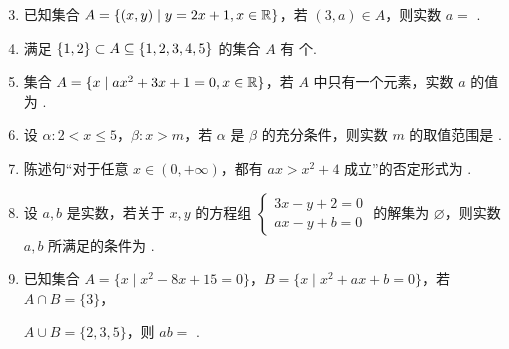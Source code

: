 \documentclass[a4paper,11pt]{article}
\begin{document}


\begin{enumerate}
\setcounter{enumi}{2}

\item 已知集合 $A=\{(x,y)\mid y=2x+1,x\in\mathbb{R}\}$，若 $(3,a)\in A$，则实数 $a=$ \blankline[4.4em].

\ifanswer
\solbegin
{}
\solend

\fi

\item 满足 $\{1,2\}\subset A\subseteq\{1,2,3,4,5\}$ 的集合 $A$ 有 \blankline[4.4em] 个.


\item 集合 $A=\{x\mid ax^2+3x+1=0,x\in\mathbb{R}\}$，若 $A$ 中只有一个元素，实数 $a$ 的值为 \blankline[4.4em].


\item 设 $\alpha:2<x\leqslant5$，$\beta:x>m$，若 $\alpha$ 是 $\beta$ 的充分条件，则实数 $m$ 的取值范围是 \blankline[4.4em].

\ifanswer
\solbegin
\step{由题意得 $m\leqslant2$. 故实数 $m$ 的取值范围是 $[2,+\infty)$.}
\solend

\fi

\item 陈述句“对于任意 $x\in(0,+\infty)$，都有 $ax>x^2+4$ 成立”的否定形式为 \blankline[4.4em].


\item 设 $a,b$ 是实数，若关于 $x,y$ 的方程组 $\begin{cases}3x-y+2=0\\ ax-y+b=0\end{cases}$ 的解集为 $\varnothing$，则实数 $a,b$ 所满足的条件为 \blankline[4.4em].


\item 已知集合 $A=\{x\mid x^2-8x+15=0\}$，$B=\{x\mid x^2+ax+b=0\}$，若 $A\cap B=\{3\}$，

$A\cup B=\{2,3,5\}$，则 $ab=$ \blankline[4.4em].


\end{enumerate}
\end{document}
